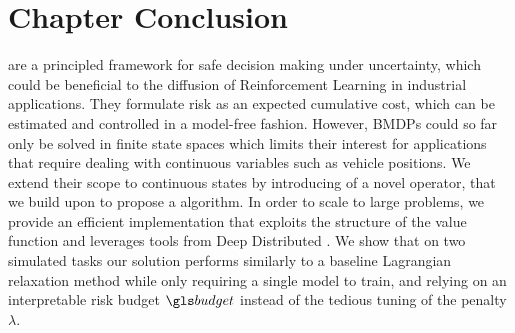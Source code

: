 \section*{Chapter Conclusion}
\label{sec:conclusion}
 are a principled framework for safe decision making under uncertainty, which could be beneficial to the diffusion of Reinforcement Learning in industrial applications. They formulate risk as an expected cumulative cost, which can be estimated and controlled in a model-free fashion. However, \glspl{BMDP} could so far only be solved in finite state spaces which limits their interest for  applications that require dealing with continuous variables such as vehicle positions. We extend their scope to continuous states by introducing of a novel  operator, that we build upon to propose a  algorithm. In order to scale to large problems, we provide an efficient implementation that exploits the structure of the value function and leverages tools from Deep Distributed . We show that on two simulated tasks our solution performs similarly to a baseline Lagrangian relaxation method while only requiring a single model to train, and relying on an interpretable risk budget $\budget$ instead of the tedious tuning of the penalty $\lambda$.

\clearpage

